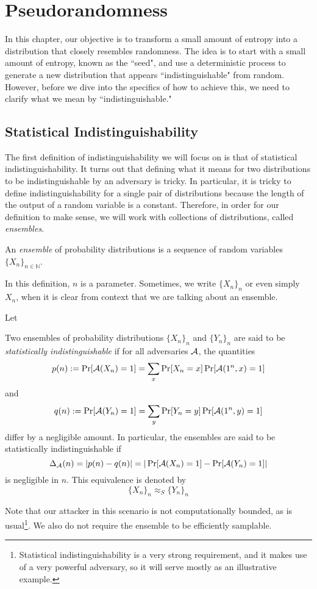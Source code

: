 \chapter{Pseudorandomness}
In this chapter, our objective is to transform a small amount of entropy into a distribution that closely resembles randomness.
The idea is to start with a small amount of entropy, known as the ``seed", and use a deterministic process to generate a new distribution that appears ``indistinguishable" from random. 
However, before we dive into the specifics of how to achieve this, we need to clarify what we mean by ``indistinguishable."

\section{Statistical Indistinguishability}
The first definition of indistinguishability we will focus on is that of statistical indistinguishability.
It turns out that defining what it means for two distributions to be indistinguishable by an adversary is tricky.
In particular, it is tricky to define indistinguishability for a single pair of distributions because the length of the output of a random variable is a constant.
Therefore, in order for our definition to make sense, we will work with collections of distributions, called \emph{ensembles}.

\begin{definition}
An \emph{ensemble} of probability distributions is a sequence of random variables $\{X_n\}_{n\in \mathbb{N}}$. 
\end{definition}
In this definition, $n$ is a parameter.
Sometimes, we write $\{X_n\}_n$ or even simply $X_n$, when it is clear from context that we are talking about an ensemble.

\begin{definition}

    Let

    Two ensembles of probability distributions $\{X_n\}_n$ and $\{Y_n\}_n$ are said to be \emph{statistically indistinguishable} if for all adversaries $\mathcal{A}$, the quantities
    $$p(n) := \Pr[\mathcal{A}(X_n) = 1] = \sum_x \Pr[X_n = x]\Pr[\mathcal{A}(1^n,x) = 1]$$
    and
    $$q(n) := \Pr[\mathcal{A}(Y_n) = 1] = \sum_y \Pr[Y_n = y]\Pr[\mathcal{A}(1^n,y) = 1]$$
    differ by a negligible amount.
    In particular, the ensembles are said to be statistically indistinguishable if
    $$\Delta_{\mathcal{A}}(n) = |p(n) - q(n)| = |\Pr[\mathcal{A}(X_n) = 1] - \Pr[\mathcal{A}(Y_n) = 1]|$$
    is negligible in $n$.
This equivalence is denoted by
$$\{X_n\}_n \approx_S \{Y_n\}_n$$
\end{definition}
Note that our attacker in this scenario is not computationally bounded, as is usual\footnote{Statistical indistinguishability is a very strong requirement, and it makes use of a very powerful adversary, so it will serve mostly as an illustrative example.}.
We also do not require the ensemble to be efficiently samplable.

